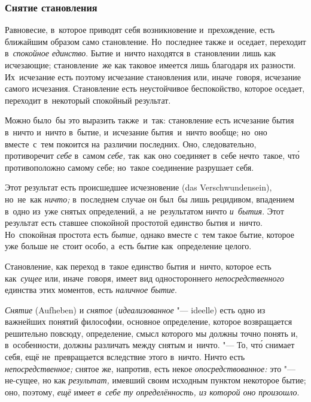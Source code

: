 \subsubsection{Снятие становления}

Равновесие, в~которое приводят себя возникновение и~прехождение, есть ближайшим
образом само становление. Но~последнее также и~оседает, переходит
в~{\em спокойное единство}. Бытие и~ничто находятся в~становлении лишь как
исчезающие; становление~же как таковое имеется лишь благодаря их разности.
Их~исчезание есть поэтому исчезание становления или, иначе~говоря, исчезание
самого исчезания. Становление есть неустойчивое беспокойство, которое оседает,
переходит в~некоторый спокойный результат.

Можно было~бы это выразить также~и~так: становление есть исчезание бытия
в~ничто и~ничто в~бытие, и~исчезание бытия~и~ничто вообще; но~оно вместе~с~тем
покоится на~различии последних. Оно, следовательно, противоречит {\em себе}
в~самом {\em себе,} так~как оно соединяет в~себе нечто~такое, чт\'{о}
противоположно самому себе; но~такое соединение разрушает себя.

Этот результат есть происшедшее исчезновение (das Ver\-schwun\-den\-sein),
но~не~как {\em ничто;} в~последнем случае он был~бы лишь рецидивом, впадением
в~одно из~уже снятых определений, а~не~результатом ничто {\em и~бытия}. Этот
результат есть ставшее спокойной простотой единство бытия и~ничто. Но~спокойная
простота есть {\em бытие,} однако вместе с~тем такое бытие, которое уже больше
не~стоит особо, а~есть бытие как~определение целого.

Становление, как переход в~такое единство бытия и~ничто, которое есть
как~{\em сущее} или, иначе~говоря, имеет вид одностороннего
{\em непосредственного} единства этих моментов, есть {\em наличное бытие}.


{\em Снятие} (Aufheben) и {\em снятое} ({\em идеализованное} "--- ideelle) есть
одно из важнейших понятий философии, основное определение, которое возвращается
решительно повсюду, определение, смысл которого мы должны точно понять и,
в~особенности, должны различать между снятым и~ничто. "--- То, чт\'{о} снимает
себя, ещё не~превращается вследствие этого в~ничто. Ничто есть {\em
непосредственное;} снятое же, напротив, есть некое {\em опосредствованное:} это
"--- не-сущее, но как {\em результат,} имевший своим исходным пунктом некоторое
бытие; оно, поэтому, {\em ещё} имеет {\em в~себе ту определённость, из которой
оно произошло}.

